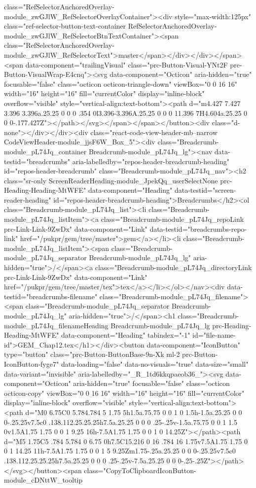 class="RefSelectorAnchoredOverlay-module_zwGJlW_RefSelectorOverlayContainer"><div style="max-width:125px" class="ref-selector-button-text-container RefSelectorAnchoredOverlay-module_zwGJlW_RefSelectorBtnTextContainer"><span class="RefSelectorAnchoredOverlay-module_zwGJlW_RefSelectorText">master</span></div></div></span><span data-component="trailingVisual" class="prc-Button-Visual-YNt2F prc-Button-VisualWrap-E4cnq"><svg data-component="Octicon" aria-hidden="true" focusable="false" class="octicon octicon-triangle-down" viewBox="0 0 16 16" width="16" height="16" fill="currentColor" display="inline-block" overflow="visible" style="vertical-align:text-bottom"><path d="m4.427 7.427 3.396 3.396a.25.25 0 0 0 .354 0l3.396-3.396A.25.25 0 0 0 11.396 7H4.604a.25.25 0 0 0-.177.427Z"></path></svg></span></span></button><div class="d-none"></div></div><div class="react-code-view-header-mb--narrow CodeViewHeader-module_jjsF6W_Box_5"><div class="Breadcrumb-module_pL74Jq_container Breadcrumb-module_pL74Jq_lg"><nav data-testid="breadcrumbs" aria-labelledby="repos-header-breadcrumb-heading" id="repos-header-breadcrumb" class="Breadcrumb-module_pL74Jq_nav"><h2 class="sr-only ScreenReaderHeading-module_JpekQq_userSelectNone prc-Heading-Heading-MtWFE" data-component="Heading" data-testid="screen-reader-heading" id="repos-header-breadcrumb-heading">Breadcrumbs</h2><ol class="Breadcrumb-module_pL74Jq_list"><li class="Breadcrumb-module_pL74Jq_listItem"><a class="Breadcrumb-module_pL74Jq_repoLink prc-Link-Link-9ZwDx" data-component="Link" data-testid="breadcrumbs-repo-link" href="/pukpr/gem/tree/master">gem</a></li><li class="Breadcrumb-module_pL74Jq_listItem"><span class="Breadcrumb-module_pL74Jq_separator Breadcrumb-module_pL74Jq_lg" aria-hidden="true">/</span><a class="Breadcrumb-module_pL74Jq_directoryLink prc-Link-Link-9ZwDx" data-component="Link" href="/pukpr/gem/tree/master/tex">tex</a></li></ol></nav><div data-testid="breadcrumbs-filename" class="Breadcrumb-module_pL74Jq_filename"><span class="Breadcrumb-module_pL74Jq_separator Breadcrumb-module_pL74Jq_lg" aria-hidden="true">/</span><h1 class="Breadcrumb-module_pL74Jq_filenameHeading Breadcrumb-module_pL74Jq_lg prc-Heading-Heading-MtWFE" data-component="Heading" tabindex="-1" id="file-name-id">GEM_Chap12.tex</h1></div><button data-component="IconButton" type="button" class="prc-Button-ButtonBase-9n-Xk ml-2 prc-Button-IconButton-fyge7" data-loading="false" data-no-visuals="true" data-size="small" data-variant="invisible" aria-labelledby="_R_1td6kkqpaeob36_"><svg data-component="Octicon" aria-hidden="true" focusable="false" class="octicon octicon-copy" viewBox="0 0 16 16" width="16" height="16" fill="currentColor" display="inline-block" overflow="visible" style="vertical-align:text-bottom"><path d="M0 6.75C0 5.784.784 5 1.75 5h1.5a.75.75 0 0 1 0 1.5h-1.5a.25.25 0 0 0-.25.25v7.5c0 .138.112.25.25.25h7.5a.25.25 0 0 0 .25-.25v-1.5a.75.75 0 0 1 1.5 0v1.5A1.75 1.75 0 0 1 9.25 16h-7.5A1.75 1.75 0 0 1 0 14.25Z"></path><path d="M5 1.75C5 .784 5.784 0 6.75 0h7.5C15.216 0 16 .784 16 1.75v7.5A1.75 1.75 0 0 1 14.25 11h-7.5A1.75 1.75 0 0 1 5 9.25Zm1.75-.25a.25.25 0 0 0-.25.25v7.5c0 .138.112.25.25.25h7.5a.25.25 0 0 0 .25-.25v-7.5a.25.25 0 0 0-.25-.25Z"></path></svg></button><span class="CopyToClipboardIconButton-module_cDNttW_tooltip 